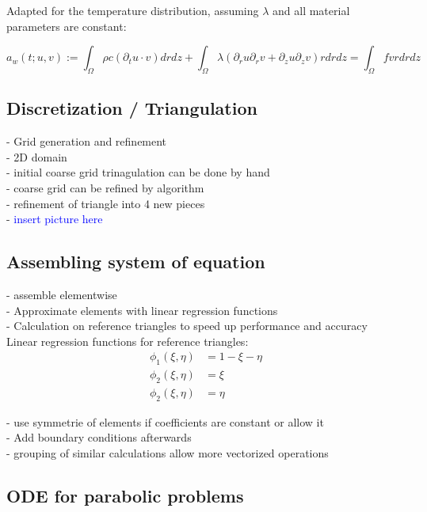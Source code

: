\documentclass[parskip=half, titlepage=yes, 12pt, BCOR=12mm, DIV=calc]{scrartcl}
\begin{document}
Adapted for the temperature distribution, assuming $\lambda$ and all material parameters are constant: 

\begin{equation}
    a_w(t;u,v) := \int_{\Omega} \rho c (\partial_t u \cdot v) drdz + \int_{\Omega} \lambda (\partial_r u \partial_r v + \partial_z u \partial_z v) r drdz = \int_{\Omega} f v r dr dz
\end{equation}

\newpage


\subsection{Discretization / Triangulation}

- Grid generation and refinement \\
- 2D domain \\
- initial coarse grid trinagulation can be done by hand \\
- coarse grid can be refined by algorithm \\

- refinement of triangle into 4 new pieces \\
- \textcolor{blue}{insert picture here}

\subsection{Assembling system of equation}

- assemble elementwise \\
- Approximate elements with linear regression functions\\
- Calculation on reference triangles to speed up performance and accuracy \\

Linear regression functions for reference triangles:
\begin{align}
    \phi_1(\xi, \eta) &= 1 - \xi - \eta \\
    \phi_2(\xi, \eta) &= \xi \\
    \phi_2(\xi, \eta) &= \eta 
\end{align}

- use symmetrie of elements if coefficients are constant or allow it \\
- Add boundary conditions afterwards \\
- grouping of similar calculations allow more vectorized operations \\ 

\subsection{ODE for parabolic problems}
\end{document}
